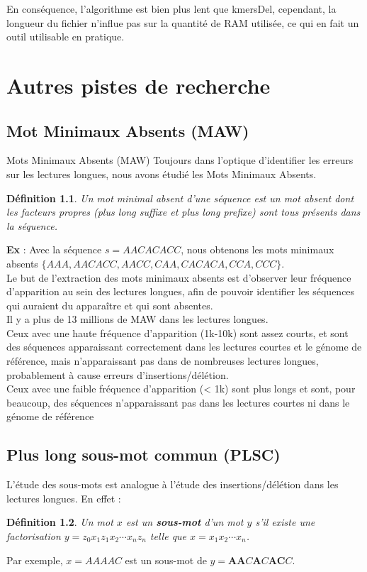 \documentclass{report}
\newtheorem{defgt}{Définition}
\begin{document}
      En conséquence, l'algorithme est bien plus lent que kmersDel, cependant, la longueur du fichier n'influe pas sur la quantité de RAM utilisée, ce qui en fait un outil utilisable en pratique.
      \newpage
  \chapter{Autres pistes de recherche}
    \section{Mot Minimaux Absents (MAW)}
    \begin{frame}[fragile]{Mots Minimaux Absents (MAW)}
      Toujours dans l'optique d'identifier les erreurs sur les lectures longues, nous avons étudié les Mots Minimaux Absents.
      \begin{defgt}
        Un mot minimal absent d'une séquence est un mot absent dont les facteurs propres (plus long suffixe et plus long prefixe) sont tous présents dans la séquence.
      \end{defgt}
      \textbf{Ex} : Avec la séquence $s = AACACACC$, nous obtenons les mots minimaux absents $\{AAA, AACACC, AACC, CAA, CACACA, CCA, CCC\}$.\\

      Le but de l'extraction des mots minimaux absents est d'observer leur fréquence d'apparition au sein des lectures longues, afin de pouvoir identifier les séquences qui auraient du apparaître et qui sont absentes.\\

      Il y a plus de 13 millions de MAW dans les lectures longues.\\

      Ceux avec une haute fréquence d’apparition (1k-10k) sont assez courts, et sont des séquences apparaissant correctement dans les lectures courtes et le génome de référence, mais n’apparaissant pas dans de nombreuses lectures longues, probablement à cause erreurs d'insertions/délétion.\\

      Ceux avec une faible fréquence d’apparition (< 1k) sont plus longs et sont, pour beaucoup, des séquences n’apparaissant pas dans les lectures courtes ni dans le génome de référence
    \end{frame}
    \section{Plus long sous-mot commun (PLSC)}
      L'étude des sous-mots est analogue à l'étude des insertions/délétion dans les lectures longues. En effet :
      \begin{defgt}
        Un mot $x$ est un \textbf{sous-mot} d'un mot $y$ s'il existe une factorisation $y=z_{0}x_{1}z_{1}x_{2}\cdots x_{n}z_{n}$ telle que $x=x_{1}x_{2}\cdots x_{n}$.
      \end{defgt}
      Par exemple, $x = AAAAC$ est un sous-mot de $y = \mathbf{AA}C\mathbf{A}C\mathbf{AC}C$.\\
\end{document}
